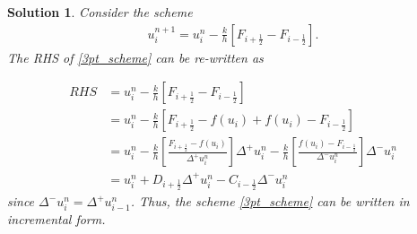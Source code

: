 \documentclass[10pt,letterpaper]{article}
\newcommand{\iph}{{i + \frac{1}{2}}}
\newcommand{\imh}{{i - \frac{1}{2}}}
\theoremstyle{break}
\newtheorem{solution}{Solution}
\begin{document}
\begin{solution}
        Consider the scheme
        \begin{gather} \label{3pt_scheme}
        u_i^{n+1} = u^n_i - \frac{k}{h} \left[ F_\iph - F_\imh\right].
        \end{gather}
        The RHS of \eqref{3pt_scheme} can be re-written as

        \begin{align*}
        RHS &= u^n_i - \frac{k}{h} \left[ F_\iph - F_\imh\right]\\
                &= u^n_i - \frac{k}{h} \left[ F_\iph  - f(u_i) + f(u_i) - F_\imh\right]\\
                &= u^n_i - \frac{k}{h} \left[ \frac{F_\iph  - f(u_i)}{\Delta ^+u_i^n} \right] \Delta ^+u_i^n - \frac{k}{h}\left[\frac{f(u_i) - F_\imh}{\Delta ^-u_i^n}\right]\Delta ^-u_i^n\\
                &= u^n_i +  D_\iph \Delta ^+u_i^n - C_\imh \Delta ^-u_i^n
        \end{align*}
        since $\Delta ^-u_i^n = \Delta ^+u_{i-1}^n$. Thus, the scheme \eqref{3pt_scheme} can be written in incremental form.
\end{solution}
\end{document}
